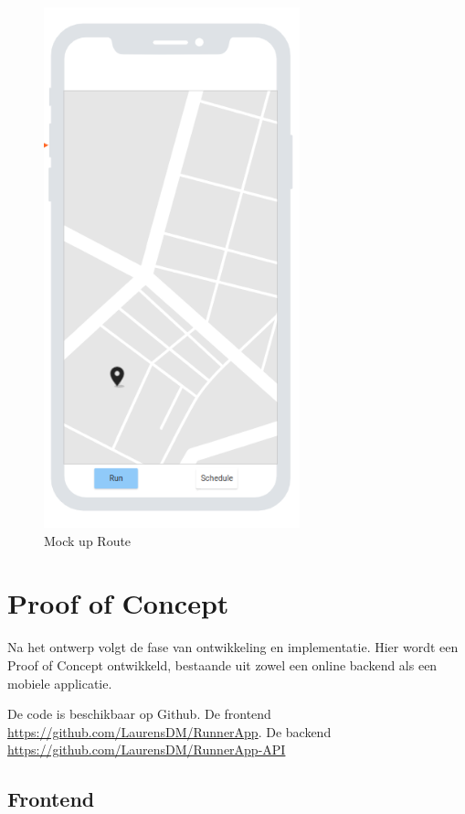     \begin{figure}[htbp]
        \includegraphics[width=20em]{./graphics/route_Mockup.png}
        \centering
        \caption{Mock up Route}
        \label{fig:routeMockup}
    \end{figure}

    \pagebreak

    \section{Proof of Concept}

    Na het ontwerp volgt de fase van ontwikkeling en implementatie. Hier wordt een Proof of Concept ontwikkeld, 
    bestaande uit zowel een online backend als een mobiele applicatie.

    De code is beschikbaar op Github. De frontend \url{https://github.com/LaurensDM/RunnerApp}.
    De backend \url{https://github.com/LaurensDM/RunnerApp-API}

    \subsection{Frontend}


